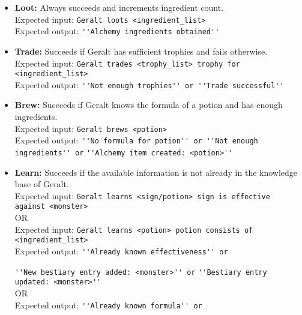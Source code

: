 \documentclass[a4paper,12pt]{article}
\begin{document}
\begin{itemize}
    \item \textbf{Loot:} Always succeeds and increments ingredient count.\\
    Expected input: \verb|Geralt loots <ingredient_list>|\\
    Expected output: \verb|''Alchemy ingredients obtained''|
    \item \textbf{Trade:} Succeeds if Geralt has sufficient trophies and fails otherwise.\\
    Expected input: \verb|Geralt trades <trophy_list> trophy for <ingredient_list>|\\
    Expected output: \verb|''Not enough trophies'' or ''Trade successful''|
    \item \textbf{Brew:} Succeeds if Geralt knows the formula of a potion and has enough ingredients.\\
    Expected input: \verb|Geralt brews <potion>|\\
    Expected output: \verb|''No formula for potion'' or ''Not enough ingredients'' or|
    \verb|''Alchemy item created: <potion>''|
    \item \textbf{Learn:} Succeeds if the available information is not already in the knowledge base of Geralt.\\
    Expected input: \verb|Geralt learns <sign/potion> sign is effective against <monster>| \\
    \quad OR \\
    Expected input: \verb|Geralt learns <potion> potion consists of <ingredient_list>|\\
    Expected output: \verb|''Already known effectiveness'' or| 
    
    \verb|''New bestiary entry added: <monster>'' or| 
    \verb|''Bestiary entry updated: <monster>''| \\
    \quad OR \\
    Expected output: \verb|''Already known formula'' or| 
    

\end{itemize}
\end{document}
